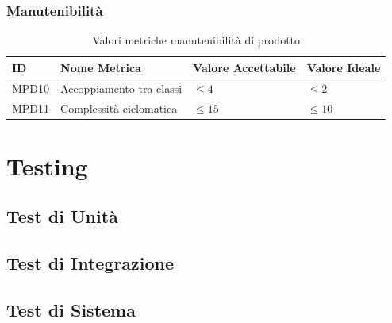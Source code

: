 \documentclass[a4paper,12pt]{article}
\begin{document}
            \subsubsection{Manutenibilità}
            \begin{longtable}{|M{1.5cm}|M{5cm}|M{2.5cm}|M{2.5cm}|}

                \caption{Valori metriche manutenibilità di prodotto} \\
                \hline
                \textbf{ID} & \textbf{Nome Metrica} & \textbf{Valore Accettabile} & \textbf{Valore Ideale} \\
                \hline
                \endhead

                    MPD10 & Accoppiamento tra classi & $\le4$ & $\le2$ \\
                    \hline

                    MPD11 & Complessità ciclomatica & $\le15$ & $\le10$ \\
                    \hline

            \end{longtable}
            
\newpage
    \section{Testing}
        \subsection{Test di Unità}

        \subsection{Test di Integrazione}

        \subsection{Test di Sistema}
\end{document}
